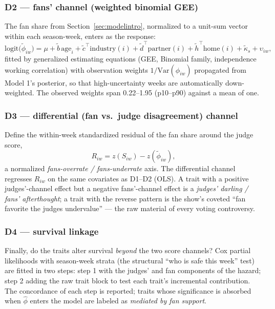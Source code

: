 \documentclass[10pt]{article}
\begin{document}
\subsubsection{D2 --- fans' channel (weighted binomial GEE)}

The fan share from Section~\ref{sec:modelintro}, normalized to a unit-sum vector within
each season-week, enters as the response:
\begin{equation}
\mathrm{logit}\big(\tilde\phi_{iw}\big) = \mu + \tilde b\,\mathrm{age}_{i}
+ \tilde c^{\top}\!\mathrm{industry}(i) + \tilde d^{\top}\!\mathrm{partner}(i)
+ \tilde h^{\top}\!\mathrm{home}(i) + \tilde\kappa_{s} + \upsilon_{iw},
\label{eq:d2}
\end{equation}
fitted by generalized estimating equations (GEE, Binomial family, independence working
correlation) with observation weights $1/\mathrm{Var}(\hat\phi_{iw})$ propagated from
Model 1's posterior, so that high-uncertainty weeks are automatically down-weighted.
The observed weights span 0.22--1.95 (p10--p90) against a mean of one.

\subsubsection{D3 --- differential (fan vs.\ judge disagreement) channel}

Define the within-week standardized residual of the fan share around the judge score,
\begin{equation}
R_{iw} = z(S_{iw}) - z(\tilde\phi_{iw}),
\end{equation}
a normalized \emph{fans-overrate / fans-underrate} axis. The differential channel regresses
$R_{iw}$ on the same covariates as D1--D2 (OLS). A trait with a positive judges'-channel
effect but a negative fans'-channel effect is a \emph{judges' darling / fans' afterthought};
a trait with the reverse pattern is the show's coveted ``fan favorite the judges
undervalue'' --- the raw material of every voting controversy.

\subsubsection{D4 --- survival linkage}

Finally, do the traits alter survival \emph{beyond} the two score channels? Cox partial
likelihoods with season-week strata (the structural ``who is safe this week'' test) are
fitted in two steps: step 1 with the judges' and fan components of the hazard;
step 2 adding the raw trait block to test each trait's incremental contribution.
The concordance of each step is reported; traits whose significance is absorbed when
$\hat\phi$ enters the model are labeled as \emph{mediated by fan support}.
\end{document}
